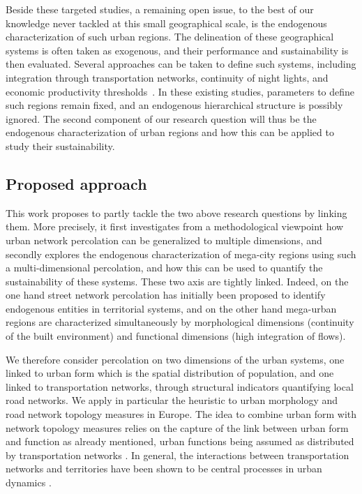 \documentclass{jimis-en}
\begin{document}
Beside these targeted studies, a remaining open issue, to the best of our knowledge never tackled at this small geographical scale, is the endogenous characterization of such urban regions. The delineation of these geographical systems is often taken as exogenous, and their performance and sustainability is then evaluated. Several approaches can be taken to define such systems, including integration through transportation networks, continuity of night lights, and economic productivity thresholds~\citep{lang2005beyond,florida2008rise}. In these existing studies, parameters to define such regions remain fixed, and an endogenous hierarchical structure is possibly ignored. The second component of our research question will thus be the endogenous characterization of urban regions and how this can be applied to study their sustainability.



\subsection{Proposed approach}

This work proposes to partly tackle the two above research questions by linking them. More precisely, it first investigates from a methodological viewpoint how urban network percolation can be generalized to multiple dimensions, and secondly explores the endogenous characterization of mega-city regions using such a multi-dimensional percolation, and how this can be used to quantify the sustainability of these systems. These two axis are tightly linked. Indeed, on the one hand street network percolation has initially been proposed to identify endogenous entities in territorial systems, and on the other hand mega-urban regions are characterized simultaneously by morphological dimensions (continuity of the built environment) and functional dimensions (high integration of flows).

We therefore consider percolation on two dimensions of the urban systems, one linked to urban form which is the spatial distribution of population, and one linked to transportation networks, through structural indicators quantifying local road networks. We apply in particular the heuristic to urban morphology and road network topology measures in Europe. The idea to combine urban form with network topology measures relies on the capture of the link between urban form and function as already mentioned, urban functions being assumed as distributed by transportation networks \citep{raimbault2018caracterisation}. In general, the interactions between transportation networks and territories have been shown to be central processes in urban dynamics \citep{espacegeo2014effets}.
\end{document}

